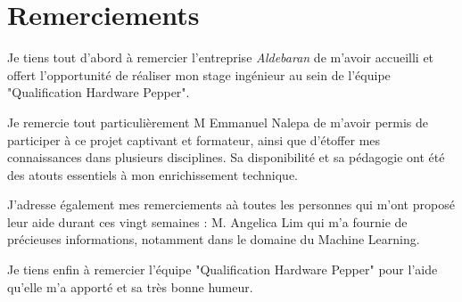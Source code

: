 \chapter*{Remerciements}
\thispagestyle{fancy}
\label{Remerciements}

Je tiens tout d'abord à remercier l'entreprise \emph{Aldebaran} de m'avoir accueilli et offert l'opportunité de réaliser mon stage ingénieur au sein de l'équipe "Qualification Hardware Pepper".

Je remercie tout particulièrement M Emmanuel Nalepa de m'avoir permis de participer à ce projet captivant et formateur, ainsi que d'étoffer mes connaissances dans plusieurs disciplines.  Sa disponibilité et sa pédagogie ont été des atouts essentiels à mon enrichissement technique.

J’adresse également mes remerciements aà toutes les personnes qui m’ont proposé leur aide durant ces vingt semaines :
M. Angelica Lim qui m’a fournie de précieuses informations, notamment dans le domaine du Machine Learning.

Je tiens enfin à remercier l'équipe "Qualification Hardware Pepper" pour l'aide qu'elle m'a apporté et sa très bonne humeur.
